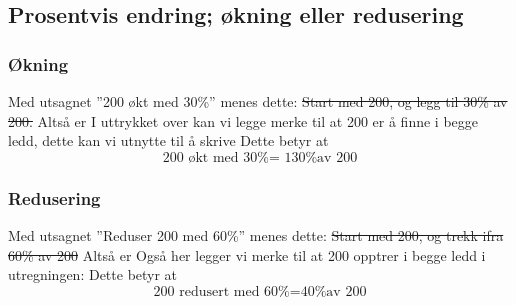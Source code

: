 \subsection{Prosentvis endring; økning eller redusering \label{Proendring}}
\subsubsection{Økning} \label{prookning}
Med utsagnet ''200 økt med 30\%'' menes dette:
\st{
Start med 200, og legg til 30\% av 200.
}
Altså er
I uttrykket over kan vi legge merke  til at 200 er å finne i begge ledd, dette kan vi utnytte til å skrive
Dette betyr at
\[ \text{200 økt med 30\% = 130\% av 200} \] 

\subsubsection{Redusering} \label{proredusering}
Med utsagnet ''Reduser 200 med 60\%'' menes dette:
\st{Start med 200, og trekk ifra 60\% av 200}
Altså er 
Også her legger vi merke til at 200 opptrer i begge ledd i utregningen:
Dette betyr at
\[ \text{200 redusert med 60\%}= \text{40\% av 200} \]

